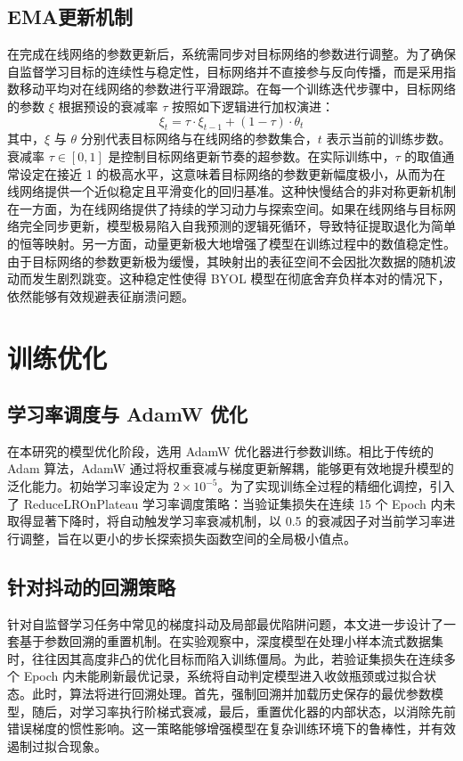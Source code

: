 \subsection{EMA更新机制}
在完成在线网络的参数更新后，系统需同步对目标网络的参数进行调整。为了确保自监督学习目标的连续性与稳定性，目标网络并不直接参与反向传播，而是采用指数移动平均对在线网络的参数进行平滑跟踪。在每一个训练迭代步骤中，目标网络的参数 $\xi$ 根据预设的衰减率 $\tau$ 按照如下逻辑进行加权演进：
\begin{equation}
  \xi_t = \tau \cdot \xi_{t-1} + (1 - \tau) \cdot \theta_t
  \label{eq:EMA}
\end{equation}
其中，$\xi$ 与 $\theta$ 分别代表目标网络与在线网络的参数集合，$t$ 表示当前的训练步数。衰减率 $\tau \in [0, 1]$ 是控制目标网络更新节奏的超参数。在实际训练中，$\tau$ 的取值通常设定在接近 1 的极高水平，这意味着目标网络的参数更新幅度极小，从而为在线网络提供一个近似稳定且平滑变化的回归基准。这种快慢结合的非对称更新机制在一方面，为在线网络提供了持续的学习动力与探索空间。如果在线网络与目标网络完全同步更新，模型极易陷入自我预测的逻辑死循环，导致特征提取退化为简单的恒等映射。另一方面，动量更新极大地增强了模型在训练过程中的数值稳定性。由于目标网络的参数更新极为缓慢，其映射出的表征空间不会因批次数据的随机波动而发生剧烈跳变。这种稳定性使得 BYOL 模型在彻底舍弃负样本对的情况下，依然能够有效规避表征崩溃问题。

\section{训练优化}
\subsection{学习率调度与 AdamW 优化}

在本研究的模型优化阶段，选用 AdamW 优化器进行参数训练。相比于传统的 Adam 算法，AdamW 通过将权重衰减与梯度更新解耦，能够更有效地提升模型的泛化能力。初始学习率设定为 $2 \times 10^{-5}$。为了实现训练全过程的精细化调控，引入了 ReduceLROnPlateau 学习率调度策略：当验证集损失在连续 15 个 Epoch 内未取得显著下降时，将自动触发学习率衰减机制，以 0.5 的衰减因子对当前学习率进行调整，旨在以更小的步长探索损失函数空间的全局极小值点。

\subsection{针对抖动的回溯策略}
针对自监督学习任务中常见的梯度抖动及局部最优陷阱问题，本文进一步设计了一套基于参数回溯的重置机制。在实验观察中，深度模型在处理小样本流式数据集时，往往因其高度非凸的优化目标而陷入训练僵局。为此，若验证集损失在连续多个 Epoch 内未能刷新最优记录，系统将自动判定模型进入收敛瓶颈或过拟合状态。此时，算法将进行回溯处理。首先，强制回溯并加载历史保存的最优参数模型，随后，对学习率执行阶梯式衰减，最后，重置优化器的内部状态，以消除先前错误梯度的惯性影响。这一策略能够增强模型在复杂训练环境下的鲁棒性，并有效遏制过拟合现象。

